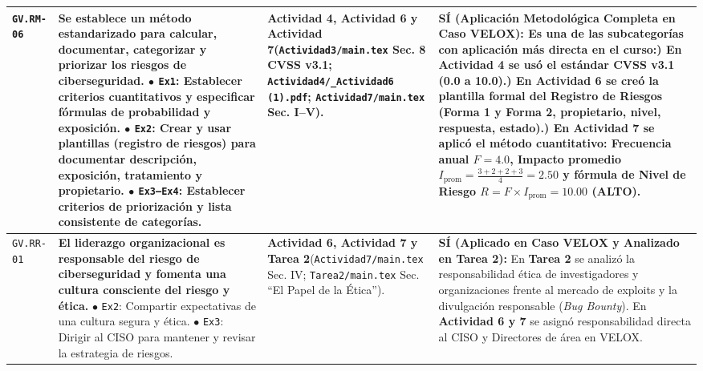 \documentclass[letterpaper,11pt]{article}
\begin{document}
\begin{longtable}{|C{1.5cm}|L{5.3cm}|L{4.3cm}|L{5.8cm}|}
\texttt{GV.RM-06} &
\textbf{Se establece un método estandarizado para calcular, documentar, categorizar y priorizar los riesgos de ciberseguridad.}\newline
$\bullet$ \texttt{Ex1}: Establecer criterios cuantitativos y especificar fórmulas de probabilidad y exposición.\newline
$\bullet$ \texttt{Ex2}: Crear y usar plantillas (registro de riesgos) para documentar descripción, exposición, tratamiento y propietario.\newline
$\bullet$ \texttt{Ex3--Ex4}: Establecer criterios de priorización y lista consistente de categorías. &
\textbf{Actividad 4, Actividad 6 y Actividad 7}\newline (\texttt{Actividad3/main.tex} Sec. 8 CVSS v3.1; \texttt{Actividad4/\_Actividad6 (1).pdf}; \texttt{Actividad7/main.tex} Sec. I--V). &
\textbf{SÍ (Aplicación Metodológica Completa en Caso VELOX):}\newline
Es una de las subcategorías con aplicación más directa en el curso:) En \textbf{Actividad 4} se usó el estándar \textbf{CVSS v3.1} (0.0 a 10.0).) En \textbf{Actividad 6} se creó la plantilla formal del \textbf{Registro de Riesgos} (Forma 1 y Forma 2, propietario, nivel, respuesta, estado).) En \textbf{Actividad 7} se aplicó el método cuantitativo: Frecuencia anual $F=4.0$, Impacto promedio $I_{\text{prom}} = \frac{3+2+2+3}{4} = 2.50$ y fórmula de Nivel de Riesgo $R = F \times I_{\text{prom}} = 10.00$ (\textbf{ALTO}). \\
\hline

\texttt{GV.RR-01} &
\textbf{El liderazgo organizacional es responsable del riesgo de ciberseguridad y fomenta una cultura consciente del riesgo y ética.}\newline
$\bullet$ \texttt{Ex2}: Compartir expectativas de una cultura segura y ética.\newline
$\bullet$ \texttt{Ex3}: Dirigir al CISO para mantener y revisar la estrategia de riesgos. &
\textbf{Actividad 6, Actividad 7 y Tarea 2}\newline (\texttt{Actividad7/main.tex} Sec. IV; \texttt{Tarea2/main.tex} Sec. ``El Papel de la Ética''). &
\textbf{SÍ (Aplicado en Caso VELOX y Analizado en Tarea 2):}\newline
En \textbf{Tarea 2} se analizó la responsabilidad ética de investigadores y organizaciones frente al mercado de exploits y la divulgación responsable (\textit{Bug Bounty}). En \textbf{Actividad 6 y 7} se asignó responsabilidad directa al CISO y Directores de área en VELOX. \\
\hline


\end{longtable}
\end{document}
